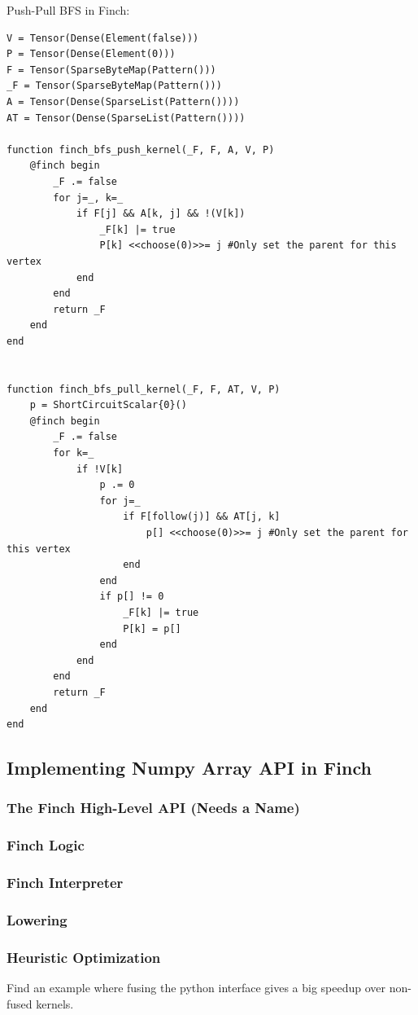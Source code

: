 Push-Pull BFS in Finch:
\begin{verbatim}
V = Tensor(Dense(Element(false)))
P = Tensor(Dense(Element(0)))
F = Tensor(SparseByteMap(Pattern()))
_F = Tensor(SparseByteMap(Pattern()))
A = Tensor(Dense(SparseList(Pattern())))
AT = Tensor(Dense(SparseList(Pattern())))

function finch_bfs_push_kernel(_F, F, A, V, P)
    @finch begin
        _F .= false
        for j=_, k=_
            if F[j] && A[k, j] && !(V[k])
                _F[k] |= true
                P[k] <<choose(0)>>= j #Only set the parent for this vertex
            end
        end
        return _F
    end
end


function finch_bfs_pull_kernel(_F, F, AT, V, P)
    p = ShortCircuitScalar{0}()
    @finch begin
        _F .= false
        for k=_
            if !V[k]
                p .= 0
                for j=_
                    if F[follow(j)] && AT[j, k]
                        p[] <<choose(0)>>= j #Only set the parent for this vertex
                    end
                end
                if p[] != 0
                    _F[k] |= true
                    P[k] = p[]
                end
            end
        end
        return _F
    end
end
\end{verbatim}

\subsection{Implementing Numpy Array API in Finch}


\subsubsection{The Finch High-Level API (Needs a Name)}

\subsubsection{Finch Logic}

\subsubsection{Finch Interpreter}

\subsubsection{Lowering}
\subsubsection{Heuristic Optimization}

Find an example where fusing the python interface gives a big speedup over non-fused kernels.

